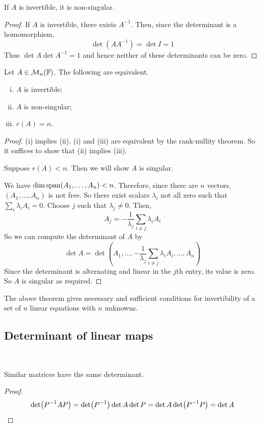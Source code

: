 \documentclass[a4paper,11pt]{article}
\begin{document}
\begin{lemma}
	If $ A $ is invertible, it is non-singular.
\end{lemma}
\begin{proof}
	If $ A $ is invertible, there exists $ A^{-1} $.
	Then, since the determinant is a homomorphism,
	\[
		\det(A A^{-1}) = \det I = 1
	\]
	Thus $ \det A \det A^{-1} = 1 $ and hence neither of these determinants can be zero.
\end{proof}
\begin{theorem}
	Let $ A \in {\mathcal{M}}_n({\mathbb{F}}) $.
	The following are equivalent.
	\begin{enumerate}[(i)]
		\item $ A $ is invertible;
		\item $ A $ is non-singular;
		\item $ r(A) = n $.
	\end{enumerate}
\end{theorem}
\begin{proof}
	(i) implies (ii).
	(i) and (iii) are equivalent by the rank-nullity theorem.
	So it suffices to show that (ii) implies (iii).

	Suppose $ r(A) < n $.
	Then we will show $ A $ is singular.
	
	We have $ \dim \operatorname{span}(A_1, \dots, A_n) < n $.
	Therefore, since there are $ n $ vectors, $ (A_1, \dots, A_n) $ is not free.
	So there exist scalars $ \lambda_i $ not all zero such that $ \sum_i \lambda_i A_i = 0 $.
	Choose $ j $ such that $ \lambda_j \neq 0 $.
	Then,
	\[
		A_j = -\frac{1}{\lambda_j} \sum_{i \neq j} \lambda_i A_i
	\]
	So we can compute the determinant of $ A $ by
	\[
		\det A = \det(A_1, \dots, -\frac{1}{\lambda_j} \sum_{i \neq j} \lambda_i A_i, \dots, A_n)
	\]
	Since the determinant is alternating and linear in the $ j $th entry, its value is zero.
	So $ A $ is singular as required.
\end{proof}

\begin{remark}
	The above theorem gives necessary and sufficient conditions for invertibility of a set of $ n $ linear equations with $ n $ unknowns.
\end{remark}

\subsection{Determinant of linear maps}\ \vspace{-1.5em}

\begin{lemma}
	Similar matrices have the same determinant.
\end{lemma}
\begin{proof}
	\[
		\det (P^{-1} A P) = \det(P^{-1}) \det A \det P = \det A \det (P^{-1} P) = \det A\qedhere
	\]
\end{proof}
\end{document}
